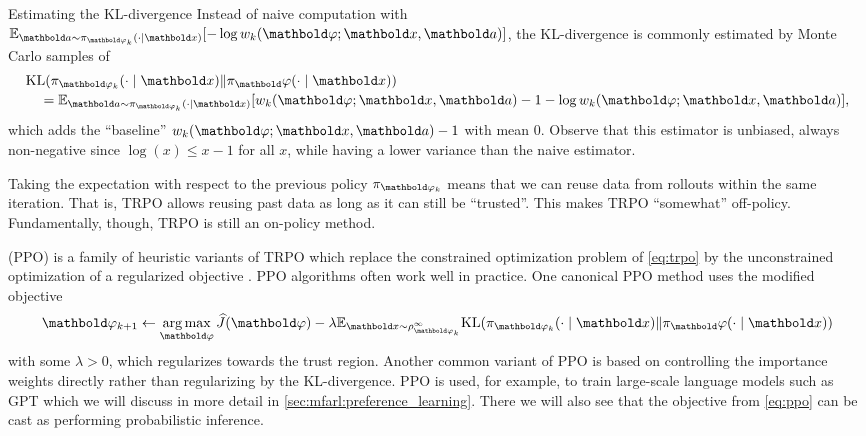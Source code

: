 \begin{rmk}{Estimating the KL-divergence}{}
  Instead of naive computation with $\E[\va \sim \pi_{\vvarphi_k}(\cdot \mid \vx)]{- \log w_k(\vvarphi; \vx, \va)}$, the KL-divergence is commonly estimated by Monte Carlo samples of \begin{align*}
    \begin{multlined}[t]
      \KL{\pi_{\vvarphi_k}(\cdot \mid \vx)}{\pi_\vvarphi(\cdot \mid \vx)} \\ = \E[\va \sim \pi_{\vvarphi_k}(\cdot \mid \vx)]{w_k(\vvarphi; \vx, \va) - 1 - \log w_k(\vvarphi; \vx, \va)},
    \end{multlined}
  \end{align*} which adds the ``baseline'' $w_k(\vvarphi; \vx, \va) - 1$ with mean $0$.
  Observe that this estimator is unbiased, always non-negative since $\log(x) \leq x - 1$ for all $x$, while having a lower variance than the naive estimator.
\end{rmk}

Taking the expectation with respect to the previous policy $\pi_{\vvarphi_k}$ means that we can reuse data from rollouts within the same iteration.
That is, TRPO allows reusing past data as long as it can still be ``trusted''.
This makes TRPO ``somewhat'' off-policy.
Fundamentally, though, TRPO is still an on-policy method.

 (PPO) is a family of heuristic variants of TRPO which replace the constrained optimization problem of \cref{eq:trpo} by the unconstrained optimization of a regularized objective \citep{schulman2017proximal,wang2020truly}.
PPO algorithms often work well in practice.
One canonical PPO method uses the modified objective \begin{align}
  \vvarphi_{k+1} \gets \argmax_{\vvarphi} \J{\vvarphi} - \lambda \E*[\vx \sim \rho_{\vvarphi_k}^\infty]{\KL{\pi_{\vvarphi_k}(\cdot \mid \vx)}{\pi_\vvarphi(\cdot \mid \vx)}} \label{eq:ppo}
\end{align} with some $\lambda > 0$, which regularizes towards the trust region.
Another common variant of PPO is based on controlling the importance weights directly rather than regularizing by the KL-divergence.
PPO is used, for example, to train large-scale language models such as GPT \citep{stiennon2020learning,openai2023gpt4} which we will discuss in more detail in \cref{sec:mfarl:preference_learning}.
There we will also see that the objective from \cref{eq:ppo} can be cast as performing probabilistic inference.

